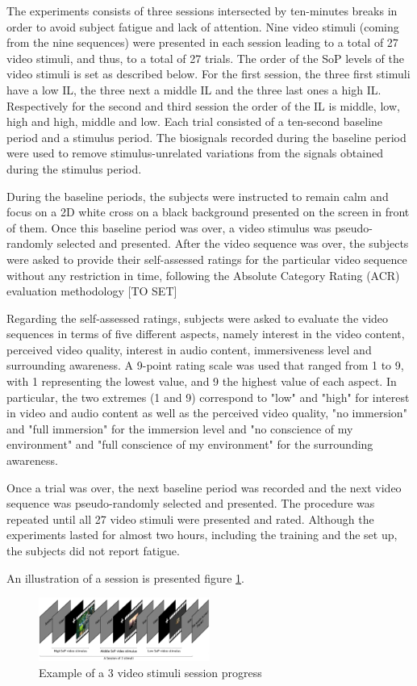 The experiments consists of three sessions intersected by ten-minutes breaks in order to avoid subject fatigue and lack of attention. Nine video stimuli (coming from the nine sequences) were presented in each session leading to a total of 27 video stimuli, and thus, to a total of 27 trials. 
The order of the \ac{SoP} levels of the video stimuli is set as described below. For the first session, the three first stimuli have a low \ac{IL}, the three next a middle \ac{IL} and the three last ones a high \ac{IL}. Respectively for the second and third session the order of the \ac{IL} is middle, low, high and high, middle and low.
Each trial consisted of a ten-second baseline period and a stimulus period. The biosignals recorded during the baseline period were used to remove stimulus-unrelated variations from the signals obtained during the stimulus period.


During the baseline periods, the subjects were instructed to remain calm and focus on a 2D white cross on a black background presented on the screen in front of them. Once this baseline period was over, a video stimulus was pseudo-randomly selected and presented.
After the video sequence was over, the subjects were asked to provide their self-assessed ratings for the particular video sequence without any restriction in time, following the Absolute Category Rating (ACR) evaluation methodology [TO SET]

Regarding the self-assessed ratings, subjects were asked to evaluate the video sequences in terms of five different aspects, namely interest in the video content, perceived video quality, interest in audio content, immersiveness level and surrounding awareness. A 9-point rating scale was used that ranged from 1 to 9, with 1 representing the lowest value, and 9 the highest value of each aspect. In particular, the two extremes (1 and 9) correspond to "low" and "high" for interest in video and audio content as well as the perceived video quality, "no immersion" and "full immersion" for the immersion level and "no conscience of my environment" and "full conscience of my environment" for the surrounding awareness.

Once a trial was over, the next baseline period was recorded and the next video sequence was pseudo-randomly selected and presented. The procedure was repeated until all 27 video stimuli were presented and rated. Although the experiments lasted for almost two hours, including the training and the set up, the subjects did not report fatigue.

An illustration of a session is presented figure \ref{session}.

\begin{figure}[!ht]
    \center
    \includegraphics[width=0.5\textwidth]{./images/ExSession_.png}
    \caption{Example of a 3 video stimuli session progress }
    \label{session}
\end{figure}









